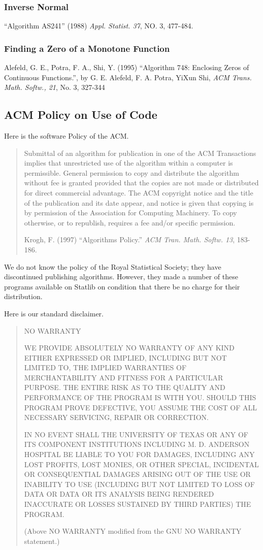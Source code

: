 \documentclass[12pt,dvips]{article}
\newcommand{\mysubsection}[1]
    {\color{green}\subsection{#1}\color{black}}
\newcommand{\mysubsubsection}[1]
    {\color{Orange}\subsubsection{#1}\color{black}}
\begin{document}
\mysubsubsection{Inverse Normal}

``Algorithm AS241'' (1988) {\em Appl. Statist. 37}, NO. 3, 477-484.

\mysubsubsection{Finding a Zero of a Monotone Function}

Alefeld,  G.  E.,  Potra,  F.  A., Shi,  Y.  (1995)  ``Algorithm  748:
Enclosing  Zeros  of  Continuous   Functions.'',  by  G.  E.  Alefeld,
F.  A. Potra, YiXun  Shi, {\em ACM  Trans.  Math. Softw.,
21}, No. 3, 327-344

\mysubsection{ACM Policy on Use of Code}

Here  is the  software Policy of  the  ACM.

\begin{quote}

     Submittal of  an  algorithm    for publication  in   one of   the  ACM
     Transactions implies that unrestricted use  of the algorithm within  a
     computer is permissible.   General permission  to copy and  distribute
     the algorithm without fee is granted provided that the copies  are not
     made  or   distributed for  direct   commercial  advantage.    The ACM
     copyright notice and the title of the publication and its date appear,
     and  notice is given that copying  is by permission of the Association
     for Computing Machinery.  To copy otherwise, or to republish, requires
     a fee and/or specific permission.

     Krogh, F.  (1997) ``Algorithms  Policy.''  {\em ACM  Tran.  Math.
     Softw.  13}, 183-186.

\end{quote}

We do not know the policy  of the Royal Statistical Society; they have
discontinued publishing  algorithms.  However,  they made a  number of
these  programs available  on Statlib  on condition  that there  be no
charge for their distribution.

Here is our standard disclaimer.

\begin{quote}

{\centering NO WARRANTY\\}

WE PROVIDE ABSOLUTELY  NO WARRANTY  OF ANY  KIND  EITHER  EXPRESSED OR
IMPLIED,  INCLUDING BUT   NOT LIMITED TO,  THE  IMPLIED  WARRANTIES OF
MERCHANTABILITY AND FITNESS FOR A PARTICULAR PURPOSE.  THE ENTIRE RISK
AS TO THE QUALITY AND PERFORMANCE OF THE PROGRAM IS  WITH YOU.  SHOULD
THIS PROGRAM PROVE  DEFECTIVE, YOU ASSUME  THE COST  OF  ALL NECESSARY
SERVICING, REPAIR OR CORRECTION.

IN NO  EVENT  SHALL THE UNIVERSITY  OF TEXAS OR  ANY  OF ITS COMPONENT
INSTITUTIONS INCLUDING M. D.   ANDERSON HOSPITAL BE LIABLE  TO YOU FOR
DAMAGES, INCLUDING ANY  LOST PROFITS, LOST MONIES,   OR OTHER SPECIAL,
INCIDENTAL   OR  CONSEQUENTIAL DAMAGES   ARISING   OUT  OF  THE USE OR
INABILITY TO USE (INCLUDING BUT NOT LIMITED TO LOSS OF DATA OR DATA OR
ITS ANALYSIS BEING  RENDERED INACCURATE OR  LOSSES SUSTAINED  BY THIRD
PARTIES) THE PROGRAM.

(Above NO WARRANTY modified from the GNU NO WARRANTY statement.)
\end{quote}
\end{document}
